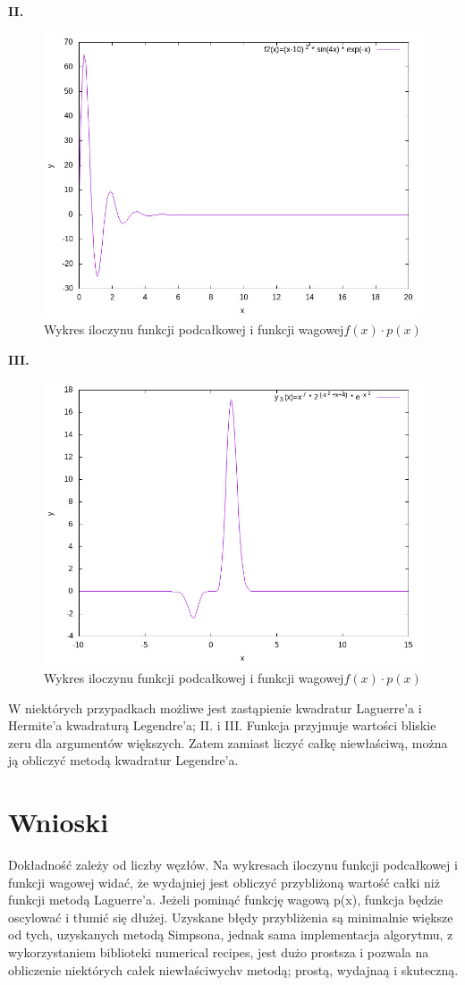 \documentclass{article}
\begin{document}
\textbf{II.}

\begin{figure}[H]
\begin{center}
\includegraphics[height=0.5\linewidth]{f2.jpg}
\caption{Wykres iloczynu funkcji podcałkowej i funkcji wagowej$f(x)\cdot p(x)$}
\label{pierwszy} 
\end{center}
\end{figure}
\newpage
\textbf{III.}

\begin{figure}[H]
\begin{center}
\includegraphics[height=0.5\linewidth]{f3.jpg}
\caption{Wykres iloczynu funkcji podcałkowej i funkcji wagowej$f(x)\cdot p(x)$}
\label{pierwszy} 
\end{center}
\end{figure}

W niektórych przypadkach
możliwe jest zastąpienie kwadratur Laguerre’a i Hermite’a kwadraturą Legendre’a; II. i III. Funkcja przyjmuje wartości bliskie zeru dla argumentów większych. Zatem zamiast liczyć całkę niewłaściwą, można ją obliczyć metodą kwadratur Legendre’a.

\section{Wnioski}
Dokładność zależy od liczby węzłów. Na wykresach iloczynu funkcji podcałkowej i funkcji wagowej widać, że wydajniej jest obliczyć przybliżoną wartość całki niż funkcji metodą Laguerre’a. Jeżeli pominąć funkcję wagową p(x), funkcja będzie oscylować i tłumić się dłużej. Uzyskane błędy przybliżenia są minimalnie większe od tych, uzyskanych metodą Simpsona, jednak
sama implementacja algorytmu, z wykorzystaniem biblioteki numerical recipes, jest dużo prostsza i pozwala na obliczenie niektórych całek niewłaściwychv metodą; prostą, wydajnaą i skuteczną.
\end{document}

